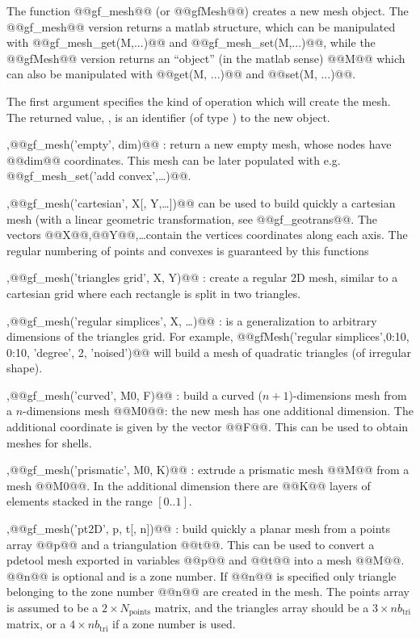 \begin{cmddescription}
  The function @@gf\_mesh@@ (or @@gfMesh@@) creates a new mesh object.
  The @@gf\_mesh@@ version returns a matlab structure, which can be
  manipulated with @@gf\_mesh\_get(M,...)@@ and
  @@gf\_mesh\_set(M,...)@@, while the @@gfMesh@@ version returns an
  ``object'' (in the matlab sense) @@M@@ which can also be manipulated
  with @@get(M, ...)@@ and @@set(M, ...)@@.

  The first argument specifies the kind of operation which will create
  the mesh.  The returned value, , is an identifier (of type
  ) to the new object.
  
  \sep{@@gf\_mesh('empty', dim)@@} : return a new empty mesh, whose nodes
  have @@dim@@ coordinates. This mesh can be later populated with
  e.g. @@gf\_mesh\_set('add convex',\ldots)@@.
  
  \sep{@@gf\_mesh('cartesian', X[, Y,\ldots])@@}  can be used to build quickly a cartesian
  mesh (with a linear geometric transformation, see @@gf\_geotrans@@. The
  vectors @@X@@,@@Y@@,\ldots contain the vertices coordinates along each axis. The
  regular numbering of points and convexes is guaranteed by this functions
  
  \sep{@@gf\_mesh('triangles grid', X, Y)@@} :  create a regular
  2D mesh, similar to a cartesian grid where each rectangle is split
  in two triangles.

  \sep{@@gf\_mesh('regular simplices', X, \ldots)@@} : is a generalization to
  arbitrary dimensions of the triangles grid. For example,
  @@gfMesh('regular simplices',0:10, 0:10, 'degree', 2, 'noised')@@
  will build a mesh of quadratic triangles (of irregular shape).
  
  \sep{@@gf\_mesh('curved', M0, F)@@} :  build a curved
  ($n+1$)-dimensions mesh from a $n$-dimensions mesh @@M0@@: the
  new mesh has one additional dimension. The additional coordinate is
  given by the vector @@F@@. This can be used to obtain meshes for shells.


  \sep{@@gf\_mesh('prismatic', M0, K)@@} :  
  extrude a prismatic mesh @@M@@ from a mesh @@M0@@. In the additional dimension
  there are @@K@@ layers of elements stacked in the range $[0..1]$.
  
  \sep{@@gf\_mesh('pt2D', p, t[, n])@@} : build quickly a planar mesh from a points
  array @@p@@ and a triangulation @@t@@. This can be used to convert a pdetool
  mesh exported in variables @@p@@ and @@t@@ into a \gf mesh @@M@@.  @@n@@ is
  optional and is a zone number. If @@n@@ is specified only triangle belonging
  to the zone number @@n@@ are created in the mesh. The points array \kw@@p@@ is
  assumed to be a $2\times N_{\text{points}}$ matrix, and the triangles array should
  be a $3\times nb_{\text{tri}}$ matrix, or a $4\times nb_{\text{tri}}$ if a zone number
  is used.
  

\end{cmddescription}
